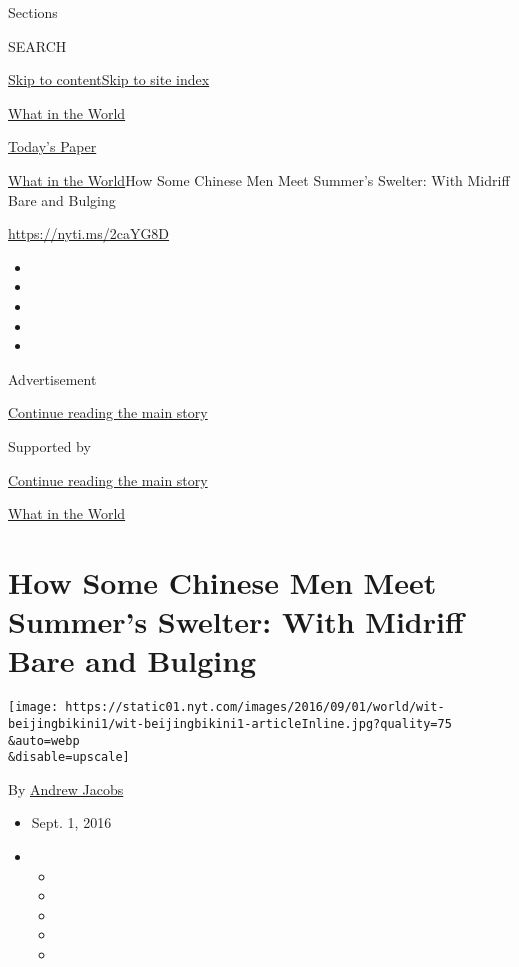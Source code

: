 Sections

SEARCH

\protect\hyperlink{site-content}{Skip to
content}\protect\hyperlink{site-index}{Skip to site index}

\href{https://www.nytimes.com/column/what-in-the-world}{What in the
World}

\href{https://myaccount.nytimes.com/auth/login?response_type=cookie\&client_id=vi}{}

\href{https://www.nytimes.com/section/todayspaper}{Today's Paper}

\href{/column/what-in-the-world}{What in the World}\textbar{}How Some
Chinese Men Meet Summer's Swelter: With Midriff Bare and Bulging

\url{https://nyti.ms/2caYG8D}

\begin{itemize}
\item
\item
\item
\item
\item
\end{itemize}

Advertisement

\protect\hyperlink{after-top}{Continue reading the main story}

Supported by

\protect\hyperlink{after-sponsor}{Continue reading the main story}

\href{/column/what-in-the-world}{What in the World}

\hypertarget{how-some-chinese-men-meet-summers-swelter-with-midriff-bare-and-bulging}{%
\section{How Some Chinese Men Meet Summer's Swelter: With Midriff Bare
and
Bulging}\label{how-some-chinese-men-meet-summers-swelter-with-midriff-bare-and-bulging}}

\texttt{[image: https://static01.nyt.com/images/2016/09/01/world/wit-beijingbikini1/wit-beijingbikini1-articleInline.jpg?quality=75\\\&auto=webp\\\&disable=upscale]}

By \href{http://www.nytimes.com/by/andrew-jacobs}{Andrew Jacobs}

\begin{itemize}
\item
  Sept. 1, 2016
\item
  \begin{itemize}
  \item
  \item
  \item
  \item
  \item
  \end{itemize}
\end{itemize}

